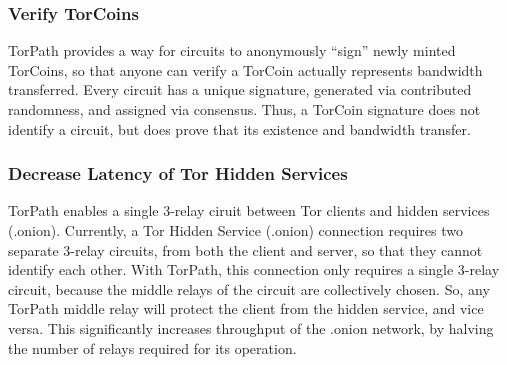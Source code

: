 \subsubsection{Verify TorCoins}
TorPath provides a way for circuits to anonymously ``sign'' newly minted TorCoins, so that anyone can verify a TorCoin actually represents bandwidth transferred. Every circuit has a unique signature, generated via contributed randomness, and assigned via consensus. Thus, a TorCoin signature does not identify a circuit, but does prove that its existence and bandwidth transfer.

\subsubsection{Decrease Latency of Tor Hidden Services}
TorPath enables a single 3-relay ciruit between Tor clients and hidden services (.onion). Currently, a Tor Hidden Service (.onion) connection requires two separate 3-relay circuits, from both the client and server, so that they cannot identify each other. With TorPath, this connection only requires a single 3-relay circuit, because the middle relays of the circuit are collectively chosen. So, any TorPath middle relay will protect the client from the hidden service, and vice versa. This significantly increases throughput of the .onion network, by halving the number of relays required for its operation.



